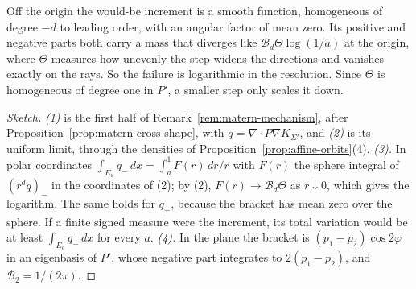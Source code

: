 Off the origin the would-be increment is a smooth function, homogeneous of degree $-d$ to leading
order, with an angular factor of mean zero. Its positive and negative parts both carry a mass that
diverges like $\mathcal{B}_d\Theta\log(1/a)$ at the origin, where $\Theta$ measures how unevenly the
step widens the directions and vanishes exactly on the rays. So the failure is logarithmic in the
resolution. Since $\Theta$ is homogeneous of degree one in $P'$, a smaller step only scales it down.

\begin{proof}[Sketch]
\emph{(1)} is the first half of Remark~\ref{rem:matern-mechanism}, after
Proposition~\ref{prop:matern-cross-shape}, with
$q = \nabla\cdot P\nabla K_{\Sigma'}$, and \emph{(2)} is its uniform limit, through the \Matern{}
densities of Proposition~\ref{prop:affine-orbits}(4). \emph{(3).} In polar coordinates
$\int_{E_a}q_-\,dx = \int_a^1F(r)\,dr/r$ with $F(r)$ the sphere integral of $(r^dq)_-$ in the
coordinates of (2); by (2), $F(r) \to \mathcal{B}_d\Theta$ as $r \downarrow 0$, which gives the logarithm.
The same holds for $q_+$, because the bracket has mean zero over the sphere. If a finite signed
measure were the increment, its total variation would be at least $\int_{E_a}q_-\,dx$ for every $a$.
\emph{(4).} In the plane the bracket is $(p_1 - p_2)\cos2\varphi$ in an eigenbasis of $P'$, whose
negative part integrates to $2(p_1 - p_2)$, and $\mathcal{B}_2 = 1/(2\pi)$.
\end{proof}

